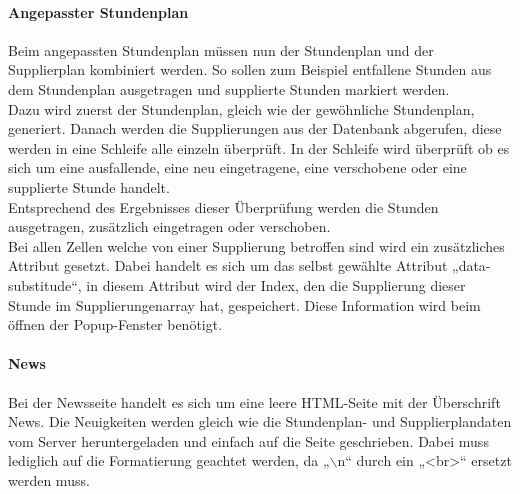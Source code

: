 \paragraph{Angepasster Stundenplan\\}
Beim angepassten Stundenplan müssen nun der Stundenplan und der Supplierplan kombiniert werden. So sollen zum Beispiel entfallene Stunden aus dem Stundenplan ausgetragen und supplierte Stunden markiert werden.\\
Dazu wird zuerst der Stundenplan, gleich wie der gewöhnliche Stundenplan, generiert. Danach werden die Supplierungen aus der Datenbank abgerufen, diese werden in eine Schleife alle einzeln überprüft. In der Schleife wird überprüft ob es sich um eine ausfallende, eine neu eingetragene, eine verschobene oder eine supplierte Stunde handelt.\\ Entsprechend des Ergebnisses dieser Überprüfung werden die Stunden ausgetragen, zusätzlich eingetragen oder verschoben.\\
Bei allen Zellen welche von einer Supplierung betroffen sind wird ein zusätzliches Attribut gesetzt. Dabei handelt es sich um das selbst gewählte Attribut „data-substitude“, in diesem Attribut wird der Index, den die Supplierung dieser Stunde im Supplierungenarray hat, gespeichert. Diese Information wird beim öffnen der Popup-Fenster benötigt.\\

\paragraph{News\\}
Bei der Newsseite handelt es sich um eine leere HTML-Seite mit der Überschrift News. Die Neuigkeiten werden gleich wie die Stundenplan- und Supplierplandaten vom Server heruntergeladen und einfach auf die Seite geschrieben. Dabei muss lediglich auf die Formatierung geachtet werden, da „$\backslash$n“ durch ein „<br>“ ersetzt werden muss.\\

